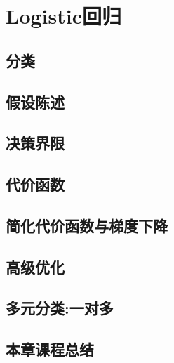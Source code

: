 \chapter{Logistic回归}

\section{分类}

\section{假设陈述}

\section{决策界限}

\section{代价函数}

\section{简化代价函数与梯度下降}

\section{高级优化}

\section{多元分类:一对多}

\section{本章课程总结}